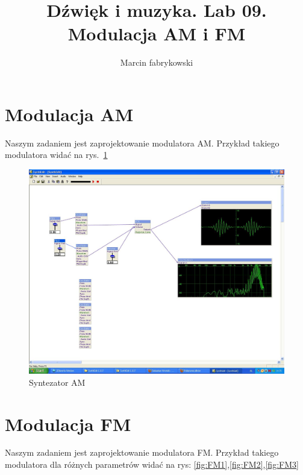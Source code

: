 \documentclass[a4paper,12pt]{article}
\author{Marcin fabrykowski}
\title{Dźwięk i muzyka. Lab 09. Modulacja AM i FM}
\begin{document}
\maketitle
\newpage
\section{Modulacja AM}
Naszym zadaniem jest zaprojektowanie modulatora AM. Przykład takiego modulatora widać na rys.~\ref{fig:AM}
\begin{figure}[h]
\hspace{-2.5cm}
\includegraphics[scale=0.4]{1.PNG}
\caption{Syntezator AM}
\label{fig:AM}
\end{figure}
\section{Modulacja FM}
Naszym zadaniem jest zaprojektowanie modulatora FM. Przykład takiego modulatora dla różnych parametrów widać na rys: \ref{fig:FM1},\ref{fig:FM2},\ref{fig:FM3}
\end{document}
